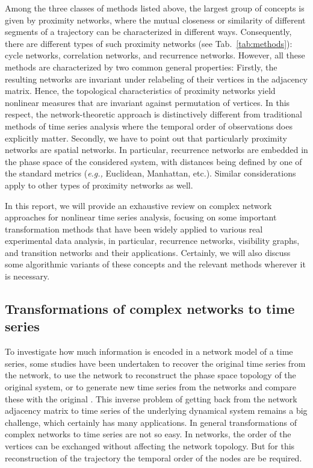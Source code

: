 		Among the three classes of methods listed above, the largest group of concepts is given by proximity networks, where the mutual closeness or similarity of different segments of a trajectory can be characterized in different ways. Consequently, there are different types of such proximity networks (see Tab.~\ref{tab:methods}): cycle networks, correlation networks, and recurrence networks. However, all these methods are characterized by two common general properties: Firstly, the resulting networks are invariant under relabeling of their vertices in the adjacency matrix. Hence, the topological characteristics of proximity networks yield nonlinear measures that are invariant against permutation of vertices. In this respect, the network-theoretic approach is distinctively different from traditional methods of time series analysis where the temporal order of observations does explicitly matter. Secondly, we have to point out that particularly proximity networks are spatial networks. In particular, recurrence networks are embedded in the phase space of the considered system, with distances being defined by one of the standard metrics (\textit{e.g.,} Euclidean, Manhattan, etc.). Similar considerations apply to other types of proximity networks as well. 

		In this report, we will provide an exhaustive review on complex network approaches for nonlinear time series analysis, focusing on some important transformation methods that have been widely applied to various real experimental data analysis, in particular, recurrence networks, visibility graphs, and transition networks and their applications. Certainly, we will also discuss some algorithmic variants of these concepts and the relevant methods wherever it is necessary. 

		\subsection{Transformations of complex networks to time series}
		To investigate how much information is encoded in a network model of a time series, some studies have been undertaken to recover the original time series from the network, to use the network to reconstruct the phase space topology of the original system, or to generate new time series from the networks and compare these with the original \cite{Campanharo2011,hirata2008,Hirata2016,McCullough2017}. This inverse problem of getting back from the network adjacency matrix to time series of the underlying dynamical system remains a big challenge, which certainly has many applications. In general transformations of complex networks to time series are not so easy. In networks, the order of the vertices can be exchanged without affecting the network topology. But for this reconstruction of the trajectory the temporal order of the nodes are be required. 
		
